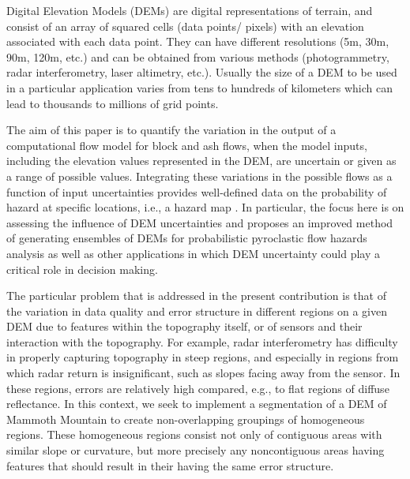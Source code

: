 \documentclass[12pt,letterpaper]{article}
\begin{document}
Digital Elevation Models (DEMs) are digital representations of terrain, and consist of an 
array of squared cells (data points/ pixels) with an elevation associated with each data point. They can 
have different resolutions (5m, 30m, 90m, 120m, etc.) and can be obtained from various methods 
(photogrammetry, radar interferometry, laser altimetry, etc.). Usually the size of a DEM to be used in a particular application varies from
tens to hundreds of kilometers which can lead to thousands to millions of grid points. 
 
The aim of this paper is to quantify the variation in the output of a computational flow model for 
block and ash flows, when the model inputs, including the elevation values represented in the DEM, are
uncertain or given as a range of possible values. Integrating these variations in the possible flows 
as a function of input uncertainties provides well-defined data on the probability of hazard at
specific locations, i.e., a hazard map \citep{Keith}.  In particular, the focus here is on assessing the 
influence of DEM uncertainties and proposes an improved method of generating ensembles of DEMs for probabilistic pyroclastic flow hazards analysis as well as other applications in which DEM uncertainty could play a critical role in decision making.  

The particular problem that is addressed in the present contribution is that of the variation in data quality and error structure in different regions on a given DEM due to features within the topography itself, or of sensors and their interaction with the topography.  For example,  radar interferometry has difficulty in properly capturing topography in steep regions, and especially in regions from which radar return is insignificant, such as slopes facing away from the sensor.  In these regions, errors are relatively high compared, e.g., to flat regions of diffuse reflectance.  In this context, we seek to implement a segmentation of a DEM of Mammoth Mountain to create non-overlapping groupings of homogeneous regions.  These homogeneous regions consist not only of contiguous areas with similar slope or curvature, but more precisely any noncontiguous areas having features that should result in their having the same error structure.  
\end{document}
